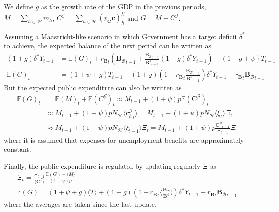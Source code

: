 \documentclass[a4paper, headings=standardclasses]{scrartcl}
\begin{document}
We define $g$ as the growth rate of the GDP %
in the previous periods, $M = \sum_{h \in \mathcal{H}} m_h$, $C^\mathcal{G}= \sum_{h \in \mathcal{H}} (p_\mathbf{C} \mathbf{c})^\mathcal{G}_h$ and $G = M + C^\mathcal{G}$.

Assuming a Maastricht-like scenario in which Government has a target deficit $\delta^*$ to achieve, the expected balance of the next period can be written as
\begin{align*}
	(1+g) \delta^* Y_{t-1} & =  {\mathbb{E}(G)}_t + {r_\mathbf{B}}_t ({\mathbf{B}_\mathcal{B}}_{t-1} + \frac{{\mathbf{B}_\mathcal{B}}_{t-1}}{{\mathbf{B}^\mathcal{G}}_{t-1}} (1+g) \delta^* Y_{t-1}) - (1+g+\psi) T_{t-1} \\
	\mathbb{E}(G)_t        & = (1+\psi+g) T_{t-1} + (1+g)(1-{r_\mathbf{B}}_t \frac{{\mathbf{B}_\mathcal{B}}_{t-1}}{{\mathbf{B}^\mathcal{G}}_{t-1}})\delta^* Y_{t-1} - {r_\mathbf{B}}_t {\mathbf{B}_\mathcal{B}}_{t-1}
\end{align*}
But the expected public expenditure can also be written as
\begin{align*}
	\mathbb{E}(G)_t & = \mathbb{E}(M)_t + \mathbb{E}(C^\mathcal{G})_t \approx M_{t-1} + (1+\psi)p\mathbb{E}(\mathbf{C}^\mathcal{G})_t                                          \\
	                & \approx M_{t-1} + (1+\psi) p N_\mathcal{H} \langle {\mathbf{c}^\mathcal{G}_h}_t \rangle = M_{t-1} + (1+\psi) p N_\mathcal{H} \langle \xi_t \rangle \Xi_t \\
	                & \approx M_{t-1} + (1+\psi) p N_\mathcal{H} \langle \xi_{t-1} \rangle \Xi_t = M_{t-1} + (1+\psi) p \frac{{\mathbf{C}^\mathcal{G}}_{t-1}}{\Xi_{t-1}} \Xi_t
\end{align*}
where it is assumed that expenses for unemployment benefits are approximately constant.

Finally, the public expenditure is regulated by updating regularly $\Xi$ as
\begin{gather*}
	\Xi_t          = \frac{\Xi_{t-1}}{\langle {\mathbf{C}^\mathcal{G}} \rangle} \frac{\mathbb{E}(G) - \langle M \rangle}{(1+\psi)p}                                                                                       \\
	\mathbb{E}(G)  = (1+\psi+g) \langle T \rangle + (1+g)(1-{r_\mathbf{B}}_t \langle \frac{{\mathbf{B}_\mathcal{B}}}{{\mathbf{B}^\mathcal{G}}} \rangle)\delta^* Y_{t-1} - {r_\mathbf{B}}_t {\mathbf{B}_\mathcal{B}}_{t-1}
\end{gather*}
where the averages are taken since the last update.
\end{document}
